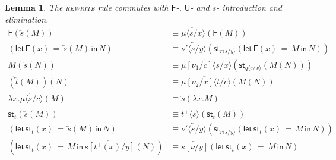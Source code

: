 \documentclass[10pt]{article}
\newtheorem{lemma}{Lemma}
\theoremstyle{definition}
\newcommand{\rewrite}[2]{\overleftarrow{#1}(#2)}
\newcommand\UE[2]{\ensuremath{#1(#2)}}
\newcommand\UI[2]{\ensuremath{\lambda #1.#2}}
\newcommand\StI[2]{\ensuremath{\mathsf{st}_{#1}(#2)}}
\newcommand\StE[4]{\ensuremath{\mathsf{let} \, \StI{#1}{#3} \, = \, {#2} \, \mathsf{in} \, #4}}
\newcommand\FE[3]{\ensuremath{\mathsf{let} \, \mathsf{F}(#2) \, = \, {#1} \, \mathsf{in} \, #3}}
\newcommand\FI[1]{\ensuremath{\mathsf{F}{(#1)}}}
\newcommand\TrPlus[2]{\ensuremath{{#1}^+(#2)}}
\newcommand\ap[2]{\ensuremath{#1 \langle #2 \rangle }}
\newcommand\ApPlus[2]{\ensuremath{{#1}^+ \langle #2 \rangle }}
\begin{document}
\begin{lemma} \label{lem:rewrite-push}
The \textsc{rewrite} rule commutes with $\mathsf{F}$-, $\mathsf{U}$- and $s$- introduction and elimination.
\begin{align*}
\FI{\rewrite{s}{M}} &\equiv \rewrite{\ap{\mu}{s/x}}{\FI{M}} \\
(\FE{\rewrite{s}{M}}{x}{N}) &\equiv \rewrite{\ap{\nu'}{s/y}}{\StI{\ap{r}{s/y}}{\FE{M}{x}{N}}} \\
\UE{M}{\rewrite{s}{N}} &\equiv \rewrite{\ap{\mu[\nu_1/c]}{s/x}}{\StI{\ap{q}{s/x}}{\UE{M}{N}}} \\
\UE{(\rewrite{t}{M})}{N} &\equiv \rewrite{\ap{\mu[\nu_2/x]}{t/c}}{\UE{M}{N}} \\
\UI{x}{\rewrite{\ap{\mu}{s/c}}{M}}  &\equiv\rewrite{s}{\UI{x}{M}} \\
\StI{t}{\rewrite{s}{M}} &\equiv \rewrite{\ApPlus{t}{s}}{\StI{t}{M}} \\
(\StE{t}{\rewrite{s}{M}}{x}{N}) &\equiv \rewrite{\ap{\nu'}{s/y}}{\StI{\ap{r}{s/y}}{\StE{t}{M}{x}{N}}} \\
(\StE{t}{M}{x}{\rewrite{s[\TrPlus{t}{x}/y]}{N}}) &\equiv \rewrite{s[\nu/y]}{\StE{t}{M}{x}{N}} 
\end{align*}
\end{lemma}
\end{document}
